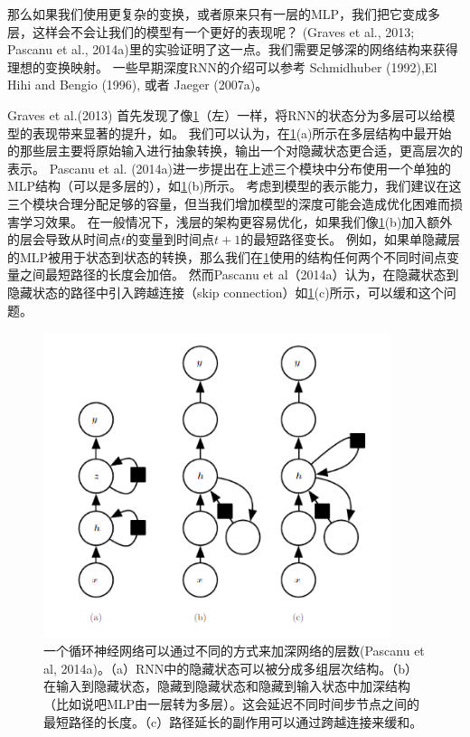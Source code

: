 那么如果我们使用更复杂的变换，或者原来只有一层的MLP，我们把它变成多层，这样会不会让我们的模型有一个更好的表现呢？
 (Graves et al., 2013; Pascanu et al., 2014a)里的实验证明了这一点。我们需要足够深的网络结构来获得理想的变换映射。 一些早期深度RNN的介绍可以参考 Schmidhuber (1992),El Hihi and Bengio (1996), 或者 Jaeger (2007a)。
 
 Graves et al.(2013) 首先发现了像\ref{fig:10_13}（左）一样，将RNN的状态分为多层可以给模型的表现带来显著的提升，如。
我们可以认为，在\ref{fig:10_13}(a)所示在多层结构中最开始的那些层主要将原始输入进行抽象转换，输出一个对隐藏状态更合适，更高层次的表示。
Pascanu et al. (2014a)进一步提出在上述三个模块中分布使用一个单独的MLP结构（可以是多层的），如\ref{fig:10_13}(b)所示。
考虑到模型的表示能力，我们建议在这三个模块合理分配足够的容量，但当我们增加模型的深度可能会造成优化困难而损害学习效果。
在一般情况下，浅层的架构更容易优化，如果我们像\ref{fig:10_13}(b)加入额外的层会导致从时间点$t$的变量到时间点$t+1$的最短路径变长。
例如，如果单隐藏层的MLP被用于状态到状态的转换，那么我们在\ref{fig:10_13}使用的结构任何两个不同时间点变量之间最短路径的长度会加倍。
然而Pascanu et al（2014a）认为，在隐藏状态到隐藏状态的路径中引入跨越连接（skip connection）如\ref{fig:10_13}(c)所示，可以缓和这个问题。

 \begin{figure}[htbp] %
   \centering
   \includegraphics[width=4in]{fig/chap10/10_13.PNG} 
   \caption{一个循环神经网络可以通过不同的方式来加深网络的层数(Pascanu et al, 2014a)。（a）RNN中的隐藏状态可以被分成多组层次结构。（b）在输入到隐藏状态，隐藏到隐藏状态和隐藏到输入状态中加深结构（比如说吧MLP由一层转为多层）。这会延迟不同时间步节点之间的最短路径的长度。（c）路径延长的副作用可以通过跨越连接来缓和。}
   \label{fig:10_13}
\end{figure}


